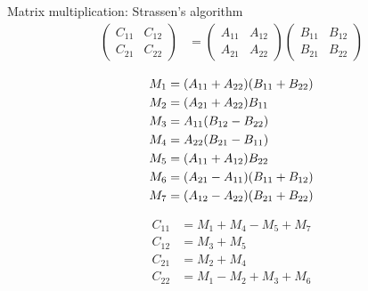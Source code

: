 \documentclass[
11pt, %
]{beamer}
\begin{document}
\begin{frame}{Matrix multiplication: Strassen's algorithm}
	\begin{align*}
	\begin{pmatrix}
	C_{11} & C_{12} \\
	C_{21} & C_{22}
	\end{pmatrix}
	&
	=
	\begin{pmatrix}
	A_{11} & A_{12} \\
	A_{21} & A_{22}
	\end{pmatrix}
	\begin{pmatrix}
	B_{11} & B_{12} \\
	B_{21} & B_{22}
	\end{pmatrix}
	\end{align*}
	
	\begin{minipage}{0.45\columnwidth}
		\begin{align*}\small
		M_1 &= (A_{11} + A_{22})(B_{11}+B_{22})\\
		M_2 &= (A_{21} + A_{22})B_{11}\\
		M_3 &= A_{11} (B_{12}-B_{22})\\
		M_4 &= A_{22} (B_{21}-B_{11})\\
		M_5 &= (A_{11} +A_{12})B_{22}\\
		M_6 &= (A_{21}-A_{11})(B_{11} +B_{12})\\
		M_7 &= (A_{12}-A_{22})(B_{21} + B_{22}) 
		\end{align*}
	\end{minipage}
	\hfill
	\begin{minipage}{0.45\columnwidth}
		\begin{center}
			\begin{align*}
			C_{11} &= M_1 + M_4 -M_5 +M_7\\
			C_{12} &= M_3 + M_5\\
			C_{21} &= M_2 + M_4\\
			C_{22} &= M_1 -M_2 + M_3 + M_6
			\end{align*}
		\end{center}
	\end{minipage}
	
\end{frame}
\end{document}
